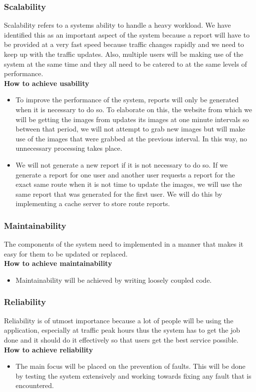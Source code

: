 \documentclass[a4paper,12pt]{article}
\begin{document}
\subsubsection{Scalability}
Scalability refers to a systems ability to handle a heavy workload. We have identified this as an important aspect of the system because a report will have to be provided at a very fast speed because traffic changes rapidly and we need to keep up with the traffic updates. Also, multiple users will be making use of the system at the same time and they all need to be catered to at the same levels of performance. \\
\textbf{How to achieve usability}
\begin{itemize}
\item To improve the performance of the system, reports will only be generated when it is necessary to do so. To elaborate on this, the website from which we will be getting the images from updates its images at one minute intervals so between that period, we will not attempt to grab new images but will make use of the images that were grabbed at the previous interval. In this way, no unnecessary processing takes place.
\item We will not generate a new report if it is not necessary to do so. If we generate a report for one user and another user requests a report for the exact same route when it is not time to update the images, we will use the same report that was generated for the first user. We will do this by implementing a cache server to store route reports.  
\end{itemize}
\subsubsection{Maintainability}
The components of the system need to implemented in a manner that makes it easy for them to be updated or replaced.\\
\textbf{How to achieve maintainability}
\begin{itemize}
\item Maintainability will be achieved by writing loosely coupled code.
\end{itemize}
\subsubsection{Reliability}
Reliability is of utmost importance because a lot of people will be using the application, especially at traffic peak hours thus the system has to get the job done and it should do it effectively so that users get the best service possible. \\
\textbf{How to achieve reliability} \\
\begin{itemize}
\item The main focus will be placed on the prevention of faults. This will be done by testing the system extensively and working towards fixing any fault that is encountered.
\end{itemize}
\end{document}

